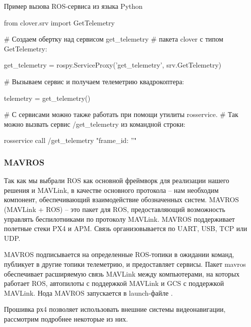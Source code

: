 \begin{Program}[H]
	\caption{Пример вызова ROS-сервиса из языка Python} \label{lst:4}
\begin{MyCode}
from clover.srv import GetTelemetry

# Создаем обертку над сервисом get_telemetry
# пакета clover с типом GetTelemetry:

get_telemetry = rospy.ServiceProxy('get_telemetry', srv.GetTelemetry)
		
# Вызываем сервис и получаем телеметрию квадрокоптера:

telemetry = get_telemetry()

# С сервисами можно также работать при помощи утилиты rosservice.
# Так можно вызвать сервис /get_telemetry из командной строки:
		
rosservice call /get_telemetry "{frame_id: ''}"
\end{MyCode}
\end{Program}

\subsubsection{MAVROS}
Так как мы выбрали ROS как основной фреймворк для реализации нашего решения и MAVLink, в качестве основного протокола -- нам необходим компонент, обеспечивающий взаимодействие обозначенных систем.
MAVROS (MAVLink + ROS) -- это пакет для ROS, предоставляющий возможность управлять беспилотниками по протоколу MAVLink. MAVROS поддерживает полетные стеки PX4 и APM. Связь организовывается по UART, USB, TCP или UDP.

MAVROS подписывается на определенные ROS-топики в ожидании команд, публикует в другие топики телеметрию, и предоставляет сервисы.
Пакет mavros обеспечивает расширяемую связь MAVLink между компьютерами, на которых работает ROS, автопилоты с поддержкой MAVLink и GCS с поддержкой MAVLink. Нода MAVROS запускается в launch-файле \cite{clover}.

Прошивка рх4 позволяет использовать внешние системы видеонавигации, рассмотрим подробнее некоторые из них.

